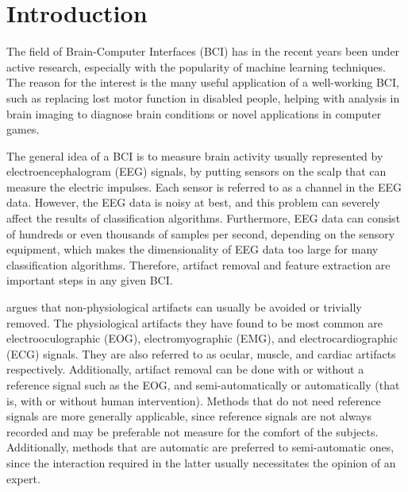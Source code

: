\section{Introduction}\label{sec:introduction}
The field of Brain-Computer Interfaces (BCI) has in the recent years been under active research, especially with the popularity of machine learning techniques. The reason for the interest is the many useful application of a well-working BCI, such as replacing lost motor function in disabled people, helping with analysis in brain imaging to diagnose brain conditions or novel applications in computer games. 

The general idea of a BCI is to measure brain activity usually represented by electroencephalogram (EEG) signals, by putting sensors on the scalp that can measure the electric impulses. Each sensor is referred to as a channel in the EEG data. However, the EEG data is noisy at best, and this problem can severely affect the results of classification algorithms. Furthermore, EEG data can consist of hundreds or even thousands of samples per second, depending on the sensory equipment, which makes the dimensionality of EEG data too large for many classification algorithms. Therefore, artifact removal and feature extraction are important steps in any given BCI.

\cite{uriguen2015eeg} argues that non-physiological artifacts can usually be avoided or trivially removed. The physiological artifacts they have found to be most common are electrooculographic (EOG), electromyographic (EMG), and electrocardiographic (ECG) signals. They are also referred to as ocular, muscle, and cardiac artifacts respectively. Additionally, artifact removal can be done with or without a reference signal such as the EOG, and semi-automatically or automatically (that is, with or without human intervention). Methods that do not need reference signals are more generally applicable, since reference signals are not always recorded and may be preferable not measure for the comfort of the subjects. Additionally, methods that are automatic are preferred to semi-automatic ones, since the interaction required in the latter usually necessitates the opinion of an expert.

